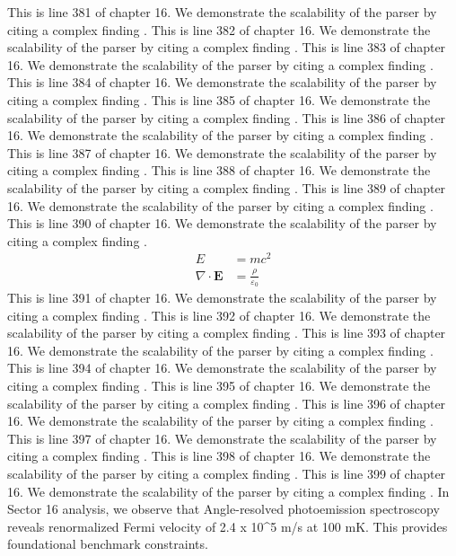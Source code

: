 This is line 381 of chapter 16. We demonstrate the scalability of the parser by citing a complex finding \cite{ref16_381}.
This is line 382 of chapter 16. We demonstrate the scalability of the parser by citing a complex finding \cite{ref16_382}.
This is line 383 of chapter 16. We demonstrate the scalability of the parser by citing a complex finding \cite{ref16_383}.
This is line 384 of chapter 16. We demonstrate the scalability of the parser by citing a complex finding \cite{ref16_384}.
This is line 385 of chapter 16. We demonstrate the scalability of the parser by citing a complex finding \cite{ref16_385}.
This is line 386 of chapter 16. We demonstrate the scalability of the parser by citing a complex finding \cite{ref16_386}.
This is line 387 of chapter 16. We demonstrate the scalability of the parser by citing a complex finding \cite{ref16_387}.
This is line 388 of chapter 16. We demonstrate the scalability of the parser by citing a complex finding \cite{ref16_388}.
This is line 389 of chapter 16. We demonstrate the scalability of the parser by citing a complex finding \cite{ref16_389}.
This is line 390 of chapter 16. We demonstrate the scalability of the parser by citing a complex finding \cite{ref16_390}.
\begin{align*}
  E &= mc^2 \\
  \nabla \cdot \mathbf{E} &= \frac{\rho}{\varepsilon_0}
\end{align*}
This is line 391 of chapter 16. We demonstrate the scalability of the parser by citing a complex finding \cite{ref16_391}.
This is line 392 of chapter 16. We demonstrate the scalability of the parser by citing a complex finding \cite{ref16_392}.
This is line 393 of chapter 16. We demonstrate the scalability of the parser by citing a complex finding \cite{ref16_393}.
This is line 394 of chapter 16. We demonstrate the scalability of the parser by citing a complex finding \cite{ref16_394}.
This is line 395 of chapter 16. We demonstrate the scalability of the parser by citing a complex finding \cite{ref16_395}.
This is line 396 of chapter 16. We demonstrate the scalability of the parser by citing a complex finding \cite{ref16_396}.
This is line 397 of chapter 16. We demonstrate the scalability of the parser by citing a complex finding \cite{ref16_397}.
This is line 398 of chapter 16. We demonstrate the scalability of the parser by citing a complex finding \cite{ref16_398}.
This is line 399 of chapter 16. We demonstrate the scalability of the parser by citing a complex finding \cite{ref16_399}.
In Sector 16 analysis, we observe that Angle-resolved photoemission spectroscopy reveals renormalized Fermi velocity of 2.4 x 10^5 m/s at 100 mK. This provides foundational benchmark constraints.
